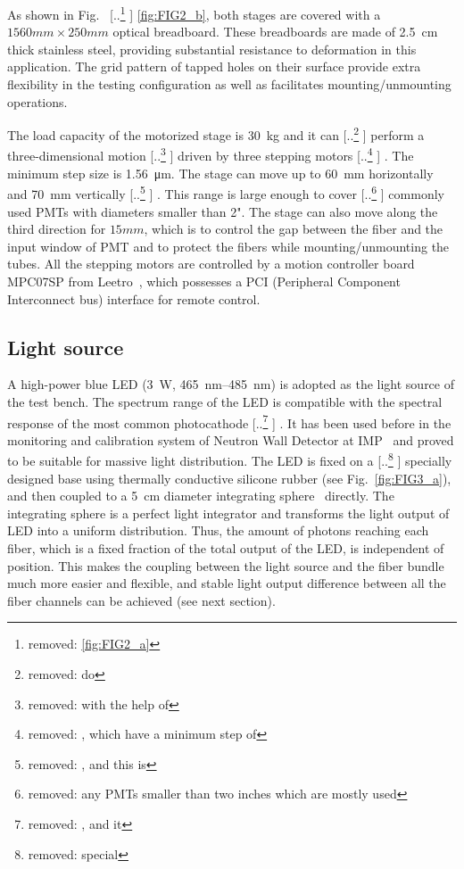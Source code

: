 \documentclass{nst}
\providecommand{\DIFadd}[1]{{\protect\color{blue} \sf #1}} %
\providecommand{\DIFdel}[1]{{\protect\color{red} [..\footnote{removed: #1} ]}} %
\providecommand{\DIFaddbegin}{} %
\providecommand{\DIFaddend}{} %
\providecommand{\DIFdelbegin}{} %
\providecommand{\DIFdelend}{} %
\begin{document}
As shown in Fig.~\DIFdelbegin \DIFdel{\ref{fig:FIG2_a}}\DIFdelend \DIFaddbegin \DIFadd{\ref{fig:FIG2_b}}\DIFaddend , both stages are covered with a $1560mm\times250mm$ optical breadboard. 
These breadboards are made of \SI{2.5}{cm} thick stainless steel, providing substantial resistance to deformation in this application. 
The grid pattern of tapped holes on their surface provide extra flexibility in the testing configuration as well as facilitates mounting/unmounting operations.

The load capacity of the motorized stage is \SI{30}{\kilo\gram} and it can \DIFdelbegin \DIFdel{do }\DIFdelend \DIFaddbegin \DIFadd{perform }\DIFaddend a three-dimensional motion \DIFdelbegin \DIFdel{with the help of }\DIFdelend \DIFaddbegin \DIFadd{driven by }\DIFaddend three stepping motors\DIFdelbegin \DIFdel{, which have a minimum step of }\DIFdelend \DIFaddbegin \DIFadd{. The minimum step size is }\DIFaddend \SI{1.56}{\micro\meter}.
The stage can move up to \SI{60}{\milli\meter} horizontally and \SI{70}{\milli\meter} vertically\DIFdelbegin \DIFdel{, and this is }\DIFdelend \DIFaddbegin \DIFadd{. This range is large }\DIFaddend enough to cover \DIFdelbegin \DIFdel{any PMTs smaller than two inches which are mostly used}\DIFdelend \DIFaddbegin \DIFadd{commonly used PMTs with diameters smaller than 2"}\DIFaddend .
The stage can also move along the third direction for $15mm$, which is to control the gap between the fiber and the input window of PMT and to protect the fibers while mounting/unmounting the tubes.
All the stepping motors are controlled by a motion controller board MPC07SP from Leetro~\cite{leetro}, which possesses a PCI (Peripheral Component Interconnect bus) interface for remote control.

\subsection{Light source}
\label{sec:light_source}

A high-power blue LED (\SI{3}{\watt}, \SIrange{465}{485}{\nano\meter}) is adopted as the light source of the test bench.
The spectrum range of the LED is compatible with the spectral response of the most common photocathode\DIFdelbegin \DIFdel{, and it }\DIFdelend \DIFaddbegin \DIFadd{.
It }\DIFaddend has been used before in the monitoring and calibration system of Neutron Wall Detector at IMP~\cite{yuyuhong_led} and proved to be suitable for massive light distribution.
The LED is fixed on a \DIFdelbegin \DIFdel{special }\DIFdelend \DIFaddbegin \DIFadd{specially }\DIFaddend designed base using thermally conductive silicone rubber (see Fig.~\ref{fig:FIG3_a}), and then coupled to a \SI{5}{\centi\meter} diameter integrating sphere~\cite{integrating_sphere} directly.
The integrating sphere is a perfect light integrator and transforms the light output of LED into a uniform distribution.
Thus, the amount of photons reaching each fiber, which is a fixed fraction of the total output of the LED, is independent of position.
This makes the coupling between the light source and the fiber bundle much more easier and flexible, and stable light output difference between all the fiber channels can be achieved (see next section).
\end{document}
